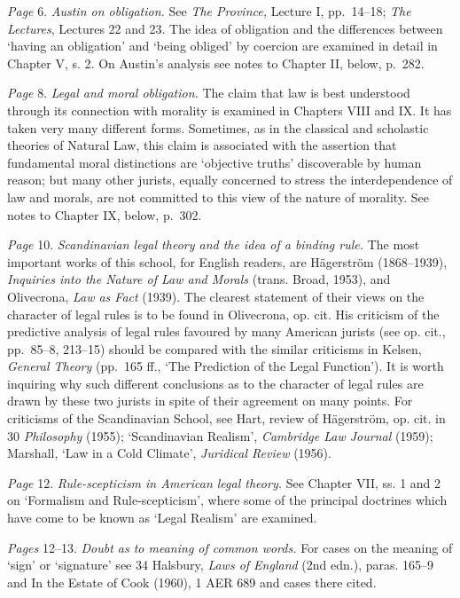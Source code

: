 \documentclass[12pt,oneside]{book}  %
\begin{document}
\emph{Page} 6. \emph{Austin on obligation.} See \emph{The Province,}
Lecture I, pp.~14--18; \emph{The Lectures}, Lectures 22 and 23. The idea
of obligation and the differences between `having an obligation' and
`being obliged' by coercion are examined in detail in Chapter V, s. 2.
On Austin's analysis see notes to Chapter II, below, p.~282.

\emph{Page} 8. \emph{Legal and moral obligation.} The claim that law is
best understood through its connection with morality is examined in
Chapters VIII and IX. It has taken very many different forms. Sometimes,
as in the classical and scholastic theories of Natural Law, this claim
is associated with the assertion that fundamental moral distinctions are
`objective truths' discoverable by human reason; but many other jurists,
equally concerned to stress the interdependence of law and morals, are
not committed to this view of the nature of morality. See notes to
Chapter IX, below, p.~302.

\emph{Page} 10. \emph{Scandinavian legal theory and the idea of a
binding rule.} The most important works of this school, for English
readers, are Hägerström (1868--1939), \emph{Inquiries into the Nature of
Law and Morals} (trans. Broad, 1953), and Olivecrona, \emph{Law as Fact}
(1939). The clearest statement of their views on the character of legal
rules is to be found in Olivecrona, op. cit. His criticism of the
predictive analysis of legal rules favoured by many American jurists
(see op. cit., pp.~85--8, 213--15) should be compared with the similar
criticisms in Kelsen, \emph{General Theory} (pp.~165 ff., `The
Prediction of the Legal Function'). It is worth inquiring why such
different conclusions as to the character of legal rules are drawn by
these two jurists in spite of their agreement on many points. For
criticisms of the Scandinavian School, see Hart, review of Hägerström,
op. cit. in 30 \emph{Philosophy} (1955); `Scandinavian Realism',
\emph{Cambridge Law Journal} (1959); Marshall, `Law in a Cold Climate',
\emph{Juridical Review} (1956).

\emph{Page} 12. \emph{Rule-scepticism in American legal theory.} See
Chapter VII, ss. 1 and 2 on `Formalism and Rule-scepticism', where some
of the principal doctrines which have come to be known as `Legal
Realism' are examined.

\emph{Pages} 12--13. \emph{Doubt as to meaning of common words.} For
cases on the meaning of `sign' or `signature' see 34 Halsbury,
\emph{Laws of England} (2nd edn.), paras. 165--9 and In the Estate of
Cook (1960), 1 AER 689 and cases there cited.
\end{document}

